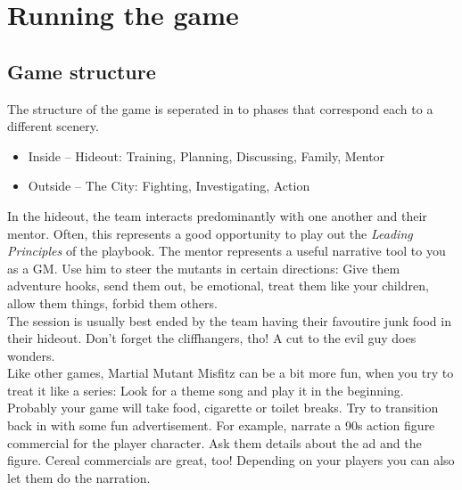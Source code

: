 \documentclass{book}
\begin{document}
\chapter*{Running the game}
\section*{Game structure}
The structure of the game is seperated in to phases that correspond each to a different scenery.
\begin{itemize}
    \item Inside -- Hideout: Training, Planning, Discussing, Family, Mentor
    \item Outside -- The City: Fighting, Investigating, Action
\end{itemize}
In the hideout, the team interacts predominantly with one another and their mentor. Often, this represents a good opportunity to play out the \emph{Leading Principles} of the playbook. The mentor represents a useful narrative tool to you as a GM. Use him to steer the mutants in certain directions: Give them adventure hooks, send them out, be emotional, treat them like your children, allow them things, forbid them others.\\
\medskip
The session is usually best ended by the team having their favoutire junk food in their hideout. Don't forget the cliffhangers, tho! A cut to the evil guy does wonders.\\
\medskip
Like other games, Martial Mutant Misfitz can be a bit more fun, when you try to treat it like a series: Look for a theme song and play it in the beginning. Probably your game will take food, cigarette or toilet breaks. Try to transition back in with some fun advertisement. For example, narrate a 90s action figure commercial for the player character. Ask them details about the ad and the figure. Cereal commercials are great, too! Depending on your players you can also let them do the narration.
\end{document}
